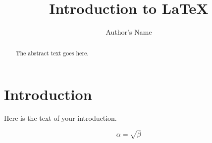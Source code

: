 \documentclass{article}
\begin{document}
\title{Introduction to \LaTeX{}}
\author{Author's Name}

\maketitle

\begin{abstract}
The abstract text goes here.
\end{abstract}

\section{Introduction}
Here is the text of your introduction.

\begin{equation}
    \label{simple_equation}
    \alpha = \sqrt{ \beta }
\end{equation}
\end{document}
